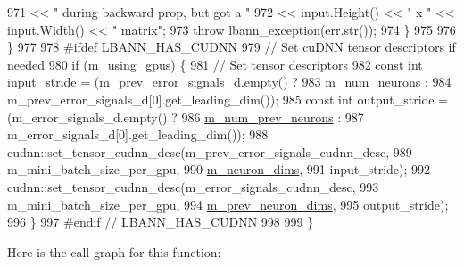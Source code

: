 \begin{DoxyCode}
971           << \textcolor{stringliteral}{" during backward prop, but got a "}
972           << input.Height() << \textcolor{stringliteral}{" x "} << input.Width() << \textcolor{stringliteral}{" matrix"};
973       \textcolor{keywordflow}{throw} lbann\_exception(err.str());
974     \}
975 
976   \}
977 
978 \textcolor{preprocessor}{  #ifdef LBANN\_HAS\_CUDNN}
979   \textcolor{comment}{// Set cuDNN tensor descriptors if needed}
980   \textcolor{keywordflow}{if} (\hyperlink{classlbann_1_1Layer_af7881cb5eff5207c15fa835d65462e8f}{m\_using\_gpus}) \{
981     \textcolor{comment}{// Set tensor descriptors}
982     \textcolor{keyword}{const} \textcolor{keywordtype}{int} input\_stride = (m\_prev\_error\_signals\_d.empty() ?
983                               \hyperlink{classlbann_1_1Layer_a6b5ebc8a7d9329d8a773ed787e7b41d8}{m\_num\_neurons} :
984                               m\_prev\_error\_signals\_d[0].get\_leading\_dim());
985     \textcolor{keyword}{const} \textcolor{keywordtype}{int} output\_stride = (m\_error\_signals\_d.empty() ?
986                                \hyperlink{classlbann_1_1Layer_ac7b30f4e28d58204bfcbb76886f9136d}{m\_num\_prev\_neurons} :
987                                m\_error\_signals\_d[0].get\_leading\_dim());
988     cudnn::set\_tensor\_cudnn\_desc(m\_prev\_error\_signals\_cudnn\_desc,
989                                  m\_mini\_batch\_size\_per\_gpu,
990                                  \hyperlink{classlbann_1_1Layer_abb34bb8031f57a483e2e327a5f229f48}{m\_neuron\_dims},
991                                  input\_stride);
992     cudnn::set\_tensor\_cudnn\_desc(m\_error\_signals\_cudnn\_desc,
993                                  m\_mini\_batch\_size\_per\_gpu,
994                                  \hyperlink{classlbann_1_1Layer_ae204d1a2a79606eaa117273857ff62a3}{m\_prev\_neuron\_dims},
995                                  output\_stride);
996   \}
997 \textcolor{preprocessor}{  #endif // LBANN\_HAS\_CUDNN}
998 
999 \}
\end{DoxyCode}
Here is the call graph for this function\+:\nopagebreak
